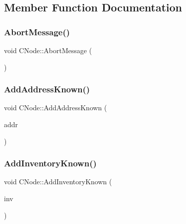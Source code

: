 \subsection{Member Function Documentation}
\mbox{\label{class_c_node_aae0fdfe555001a60bab8f216c3bc3978}} 
\subsubsection{\texorpdfstring{Abort\+Message()}{AbortMessage()}}
{\footnotesize\ttfamily void C\+Node\+::\+Abort\+Message (\begin{DoxyParamCaption}{ }\end{DoxyParamCaption})}

\mbox{\label{class_c_node_a1d2cecdd03c9da642d292f6a81ac6ed8}} 
\subsubsection{\texorpdfstring{Add\+Address\+Known()}{AddAddressKnown()}}
{\footnotesize\ttfamily void C\+Node\+::\+Add\+Address\+Known (\begin{DoxyParamCaption}\item[{const \mbox{\hyperlink{class_c_address}{C\+Address}} \&}]{addr }\end{DoxyParamCaption})\hspace{0.3cm}{\ttfamily [inline]}}

\mbox{\label{class_c_node_ac3054eb6ade84e8968f032ce3e700f6a}} 
\subsubsection{\texorpdfstring{Add\+Inventory\+Known()}{AddInventoryKnown()}}
{\footnotesize\ttfamily void C\+Node\+::\+Add\+Inventory\+Known (\begin{DoxyParamCaption}\item[{const \mbox{\hyperlink{class_c_inv}{C\+Inv}} \&}]{inv }\end{DoxyParamCaption})\hspace{0.3cm}{\ttfamily [inline]}}

